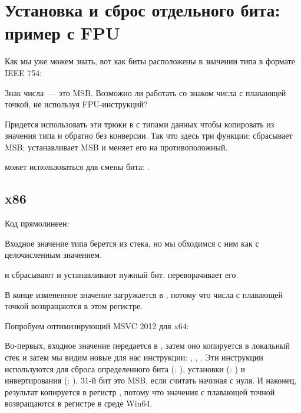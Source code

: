 \section{Установка и сброс отдельного бита: пример с \ac{FPU}}

Как мы уже можем знать, вот как биты расположены в значении типа \Tfloat в формате IEEE 754:



Знак числа~--- это \ac{MSB}. 
Возможно ли работать со знаком числа с плавающей точкой, не используя FPU-инструкций?



Придется использовать эти трюки в \CCpp с типами данных чтобы копировать из значения типа \Tfloat и обратно
без конверсии.
Так что здесь три функции:  сбрасывает \ac{MSB};  устанавливает \ac{MSB} и 
 меняет его на противоположный.

\XOR может использоваться для смены бита: .

\subsection{x86}

Код прямолинеен:



Входное значение типа \Tfloat берется из стека, но мы обходимся с ним как с целочисленным значением.

\AND и \OR сбрасывают и устанавливают нужный бит.
\XOR переворачивает его.

В конце измененное значение загружается в , потому что числа с плавающей точкой возвращаются в этом регистре.

Попробуем оптимизирующий MSVC 2012 для x64:



Во-первых, входное значение передается в , затем оно копируется в локальный стек и затем мы видим
новые для нас инструкции: \BTR, \BTS, \BTC.
Эти инструкции используются для сброса определенного бита (\BTR: ), 
установки (\BTS: ) и инвертирования (\BTC: ).
31-й бит это \ac{MSB}, если считать начиная с нуля.
И наконец, результат копируется в регистр , потому что значения с плавающей точной возвращаются
в регистре  в среде Win64.

